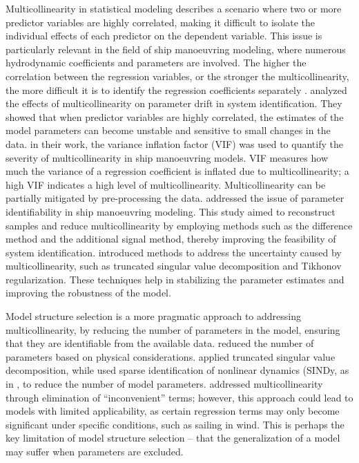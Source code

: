 Multicollinearity in statistical modeling describes a scenario where two or more predictor variables are highly correlated, making it difficult to isolate the individual effects of each predictor on the dependent variable. This issue is particularly relevant in the field of ship manoeuvring modeling, where numerous hydrodynamic coefficients and parameters are involved.
The higher the correlation between the regression variables, or the stronger the multicollinearity, the more difficult it is to identify the regression coefficients separately \cite{yoonIdentificationHydrodynamicCoefficients2003}.
\textcite{wangQuantifyingMulticollinearityShip2018} analyzed the effects of multicollinearity on parameter drift in system identification.  They showed that when predictor variables are highly correlated, the estimates of the model parameters can become unstable and sensitive to small changes in the data. in their work, the variance inflation factor (VIF) was used to quantify the severity of multicollinearity in ship manoeuvring models. VIF measures how much the variance of a regression coefficient is inflated due to multicollinearity; a high VIF indicates a high level of multicollinearity.
Multicollinearity can be partially mitigated by pre-processing the data.
\textcite{luoParameterIdentificationShip2016} addressed the issue of parameter identifiability in ship manoeuvring modeling. This study aimed to reconstruct samples and reduce multicollinearity by employing methods such as the difference method and the additional signal method, thereby improving the feasibility of system identification.
\textcite{xuUncertaintyAnalysisHydrodynamic2019} introduced methods to address the uncertainty caused by multicollinearity, such as truncated singular value decomposition and Tikhonov regularization. These techniques help in stabilizing the parameter estimates and improving the robustness of the model.

Model structure selection is a more pragmatic approach to addressing multicollinearity, by reducing the number of parameters in the model, ensuring that they are identifiable from the available data. \textcite{luoParameterIdentificationShip2016} reduced the number of parameters based on physical considerations. \textcite{costaRobustParameterEstimation2021} applied truncated singular value decomposition, while\textcite{liuPhysicsinformedIdentificationMarine2024} used sparse identification of nonlinear dynamics (SINDy, as in \cite{bruntonDiscoveringGoverningEquations2016}, to reduce the number of model parameters. 
\textcite{abkowitzMEASUREMENTHYDRODYNAMICCHARACTERISTICS1980} addressed multicollinearity through elimination of “inconvenient” terms; however, this approach could lead to models with limited applicability, as certain regression terms may only become significant under specific conditions, such as sailing in wind. This is perhaps the key limitation of model structure selection – that the generalization of a model may suffer when parameters are excluded.

